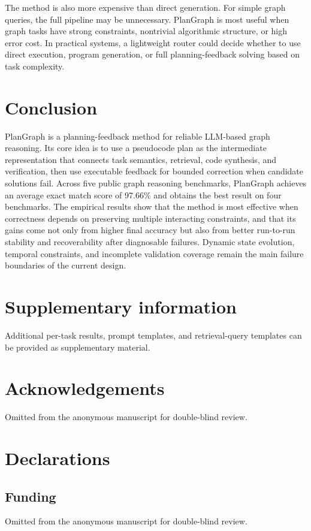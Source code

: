 \documentclass[pdflatex,sn-mathphys-num]{sn-jnl}
\theoremstyle{thmstyleone}
\theoremstyle{thmstyletwo}
\theoremstyle{thmstylethree}
\begin{document}
The method is also more expensive than direct generation. For simple graph queries, the full pipeline may be unnecessary. PlanGraph is most useful when graph tasks have strong constraints, nontrivial algorithmic structure, or high error cost. In practical systems, a lightweight router could decide whether to use direct execution, program generation, or full planning-feedback solving based on task complexity.

\section{Conclusion}\label{sec:conclusion}

PlanGraph is a planning-feedback method for reliable LLM-based graph reasoning. Its core idea is to use a pseudocode plan as the intermediate representation that connects task semantics, retrieval, code synthesis, and verification, then use executable feedback for bounded correction when candidate solutions fail. Across five public graph reasoning benchmarks, PlanGraph achieves an average exact match score of 97.66\% and obtains the best result on four benchmarks. The empirical results show that the method is most effective when correctness depends on preserving multiple interacting constraints, and that its gains come not only from higher final accuracy but also from better run-to-run stability and recoverability after diagnosable failures. Dynamic state evolution, temporal constraints, and incomplete validation coverage remain the main failure boundaries of the current design.

\backmatter

\section*{Supplementary information}
Additional per-task results, prompt templates, and retrieval-query templates can be provided as supplementary material.

\section*{Acknowledgements}
Omitted from the anonymous manuscript for double-blind review.

\section*{Declarations}

\subsection*{Funding}
Omitted from the anonymous manuscript for double-blind review.
\end{document}
